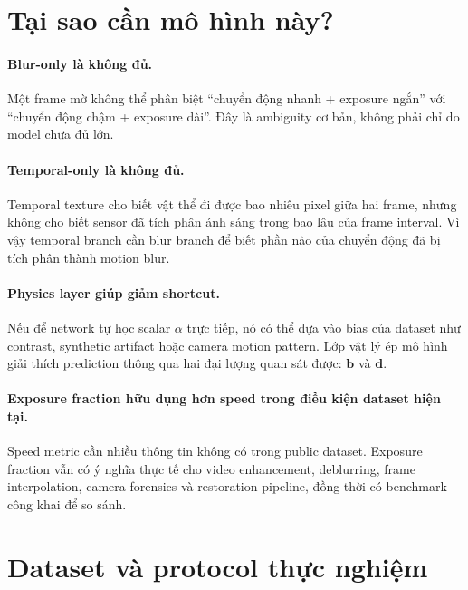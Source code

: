 \documentclass[11pt,a4paper]{article}
\newcommand{\vect}[1]{\mathbf{#1}}
\begin{document}
\section{Tại sao cần mô hình này?}

\paragraph{Blur-only là không đủ.}
Một frame mờ không thể phân biệt ``chuyển động nhanh + exposure ngắn'' với ``chuyển động chậm + exposure dài''. Đây là ambiguity cơ bản, không phải chỉ do model chưa đủ lớn.

\paragraph{Temporal-only là không đủ.}
Temporal texture cho biết vật thể đi được bao nhiêu pixel giữa hai frame, nhưng không cho biết sensor đã tích phân ánh sáng trong bao lâu của frame interval. Vì vậy temporal branch cần blur branch để biết phần nào của chuyển động đã bị tích phân thành motion blur.

\paragraph{Physics layer giúp giảm shortcut.}
Nếu để network tự học scalar $\alpha$ trực tiếp, nó có thể dựa vào bias của dataset như contrast, synthetic artifact hoặc camera motion pattern. Lớp vật lý ép mô hình giải thích prediction thông qua hai đại lượng quan sát được: $\vect b$ và $\vect d$.

\paragraph{Exposure fraction hữu dụng hơn speed trong điều kiện dataset hiện tại.}
Speed metric cần nhiều thông tin không có trong public dataset. Exposure fraction vẫn có ý nghĩa thực tế cho video enhancement, deblurring, frame interpolation, camera forensics và restoration pipeline, đồng thời có benchmark công khai để so sánh.

\section{Dataset và protocol thực nghiệm}
\end{document}
